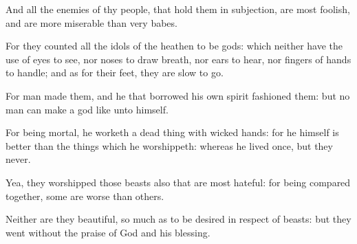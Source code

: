 {\par }{\PP {}And all the enemies of thy people, that hold them in subjection, are most foolish, and are more miserable than very babes.
\par }{\PP {}For they counted all the idols of the heathen to be gods: which neither have the use of eyes to see, nor noses to draw breath, nor ears to hear, nor fingers of hands to handle; and as for their feet, they are slow to go.
\par }{\PP {}For man made them, and he that borrowed his own spirit fashioned them: but no man can make a god like unto himself.
\par }{\PP {}For being mortal, he worketh a dead thing with wicked hands: for he himself is better than the things which he worshippeth: whereas he lived once, but they never.
\par }{\PP {}Yea, they worshipped those beasts also that are most hateful: for being compared together, some are worse than others.
\par }{\PP {}Neither are they beautiful, so much as to be desired in respect of beasts: but they went without the praise of God and his blessing.

}
